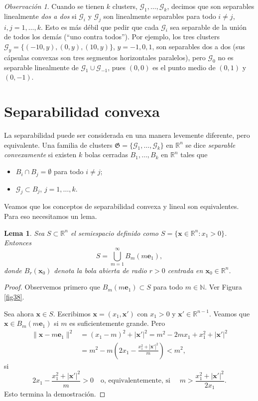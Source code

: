 \documentclass[12pt, a4paper]{amsbook}
\newcommand{\R}{{\mathbb R}}
\newcommand{\N}{{\mathbb N}}
\newcommand{\G}{{\mathcal G}}
\newcommand{\xx}{{\mathbf x}}
\newcommand{\ee}{{\mathbf e}}
\newcommand{\Gk}{{\mathfrak G}}
\newtheorem{lema}[teo]{Lema}
\theoremstyle{remark}
\newtheorem{obs}[teo]{Observaci\'on}
\theoremstyle{definition}
\numberwithin{section}{chapter}
\numberwithin{subsection}{section}
\numberwithin{equation}{section}
\numberwithin{figure}{chapter}
\begin{document}
\begin{obs}
Cuando se tienen $k$ clusters, $\G_1,\dots,\G_k$, decimos que son separables linealmente {\em dos a dos} si $\G_i$ y $\G_j$ son linealmente separables para todo $i\neq j$, $i, j=1,\dots, k$. Esto es más débil que pedir que cada $\G_i$ sea separable de la unión de todos los demás (``uno contra todos''). Por ejemplo, los tres clusters $\G_y=\{(-10,y),(0,y),(10,y)\}$, $y=-1,0,1$, son separables dos a dos (sus cápsulas convexas son tres segmentos horizontales paralelos), pero $\G_0$ no es separable linealmente de $\G_1\cup\G_{-1}$, pues $(0,0)$ es el punto medio de $(0,1)$ y $(0,-1)$.
\end{obs}

\section{Separabilidad convexa}\label{sec.c10.6}

La separabilidad puede ser considerada en una manera levemente diferente, pero equivalente. Una familia de clusters $\Gk = \{\G_1,\dots,\G_k\}$ en $\R^n$ se dice {\em separable convexamente} si existen $k$ bolas cerradas $B_1,\dots, B_k$ en $\R^n$ tales que
\begin{itemize}
\item[(i)] $B_i\cap B_j=\emptyset$ para todo $i\neq j$;
\item[(ii)] $\G_j\subset B_j$, $j=1,\dots,k$.
\end{itemize}

Veamos que los conceptos de separabilidad convexa y lineal son equivalentes. Para eso necesitamos un lema.
\begin{lema}\label{Bola.semiespacio}
Sea $S\subset \R^n$ el semiespacio definido como $S=\{\xx\in \R^n\colon x_1>0\}$. Entonces
$$
S = \bigcup_{m=1}^\infty B_m(m\ee_1),
$$
donde $B_r(\xx_0)$ denota la bola abierta de radio $r>0$ centrada en $\xx_0\in\R^n$.
\end{lema}

\begin{proof}
Observemos primero que $B_m(m\ee_1)\subset S$ para todo $m\in\N$. Ver Figura \ref{fig38}.

Sea ahora $\xx\in S$. Escribimos $\xx=(x_1, \xx')$ con $x_1>0$ y $\xx'\in\R^{n-1}$.
Veamos que $\xx\in B_m(m\ee_1)$ si $m$ es suficientemente grande. Pero
\begin{align*}
\|\xx-m\ee_1\|^2 &= (x_1-m)^2 + |\xx'|^2 = m^2 - 2m x_1 + x_1^2+|\xx'|^2\\
&= m^2-m\left(2x_1 - \frac{x_1^2 + |\xx'|^2}{m}\right)<m^2,
\end{align*}
si 
$$
2x_1 - \frac{x_1^2 + |\xx'|^2}{m} >0 \quad \text{o, equivalentemente, si }\quad m>\frac{x_1^2 + |\xx'|^2}{2x_1}.
$$
Esto termina la demostración.
\end{proof}
\end{document}
